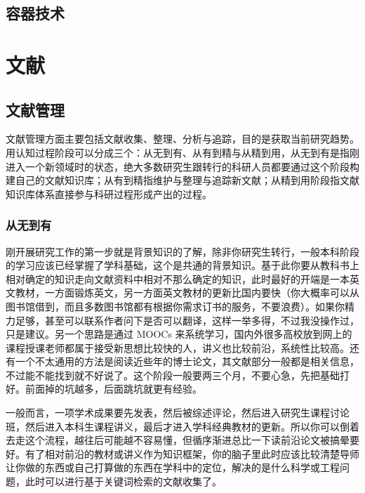 \documentclass[]{tufte-book}
\begin{document}
\hypertarget{ux5bb9ux5668ux6280ux672f}{%
\section{容器技术}\label{ux5bb9ux5668ux6280ux672f}}

\hypertarget{lib}{%
\chapter{文献}\label{lib}}

\hypertarget{ux6587ux732eux7ba1ux7406}{%
\section{文献管理}\label{ux6587ux732eux7ba1ux7406}}

文献管理方面主要包括文献收集、整理、分析与追踪，目的是获取当前研究趋势。用认知过程阶段可以分成三个：从无到有、从有到精与从精到用，从无到有是指刚进入一个新领域时的状态，绝大多数研究生跟转行的科研人员都要通过这个阶段构建自己的文献知识库；从有到精指维护与整理与追踪新文献；从精到用阶段指文献知识库体系直接参与科研过程形成产出的过程。

\hypertarget{ux4eceux65e0ux5230ux6709}{%
\subsection{从无到有}\label{ux4eceux65e0ux5230ux6709}}

刚开展研究工作的第一步就是背景知识的了解，除非你研究生转行，一般本科阶段的学习应该已经掌握了学科基础，这个是共通的背景知识。基于此你要从教科书上相对确定的知识走向文献资料中相对不那么确定的知识，此时最好的开端是一本英文教材，一方面锻炼英文，另一方面英文教材的更新比国内要快（你大概率可以从图书馆借到，而且多数图书馆都有根据你需求订书的服务，不要浪费）。如果你精力足够，甚至可以联系作者问下是否可以翻译，这样一举多得，不过我没操作过，只是建议。另一个思路是通过 MOOCs 来系统学习，国内外很多高校放到网上的课程授课老师都属于接受新思想比较快的人，讲义也比较前沿，系统性比较高。还有一个不太通用的方法是阅读近些年的博士论文，其文献部分一般都是相关信息，不过能不能找到就不好说了。这个阶段一般要两三个月，不要心急，先把基础打好。前面掉的坑越多，后面跳坑就更有经验。

一般而言，一项学术成果要先发表，然后被综述评论，然后进入研究生课程讨论班，然后进入本科生课程讲义，最后才进入学科经典教材的更新。所以你可以倒着去走这个流程，越往后可能越不容易懂，但循序渐进总比一下读前沿论文被搞晕要好。有了相对前沿的教材或讲义作为知识框架，你的脑子里此时应该比较清楚导师让你做的东西或自己打算做的东西在学科中的定位，解决的是什么科学或工程问题，此时可以进行基于关键词检索的文献收集了。
\end{document}
